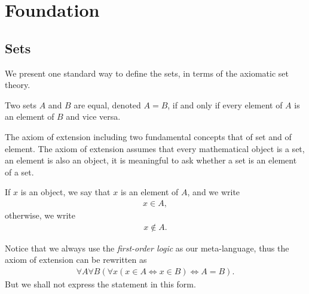
\chapter{Foundation}

\section{Sets}

\begin{comment}
We begin with na\"ive set theory. A \emph{set} $A$ is an unordered collection of objects. If $x$ is an object and if $x$ lies in $A$, we say that $x$ is an element of $A$, and we write
    \begin{align*}
        x \in A,
    \end{align*}
otherwise, we write
    \begin{align*}
        x \notin A.
    \end{align*}

If $A, B$ are sets and if every element of $A$ is an element of $B$, we say that $A$ is a \emph{subset} of $B$, and we write
    \begin{align*}
        A \subset B.
    \end{align*}
\end{comment}

We present one standard way to define the sets, in terms of the axiomatic set theory.

\begin{axiom}\label{axim:extension}
    Two sets $A$ and $B$ are equal, denoted $A = B$, if and only if every element of $A$ is an element of $B$ and vice versa.
\end{axiom}

The axiom of extension including two fundamental concepts that of set and of element. The axiom of extension assumes that every mathematical object is a set, an element is also an object, it is meaningful to ask whether a set is an element of a set.

If $x$ is an object, we say that $x$ is an element of $A$, and we write
    \begin{align*}
        x \in A,
    \end{align*}
otherwise, we write
    \begin{align*}
        x \notin A.
    \end{align*}

Notice that we always use the \emph{first-order logic} as our meta-language, thus the axiom of extension can be rewritten as
    \begin{align*}
        \forall A\forall B(\forall x(x \in A \Longleftrightarrow x \in B) \Longleftrightarrow A = B).
    \end{align*}
But we shall not express the statement in this form.

